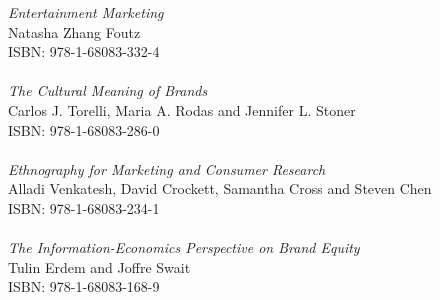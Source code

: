 \vspace{12pt}
\noindent \textit{Entertainment Marketing}\\
Natasha Zhang Foutz\\
ISBN: 978-1-68083-332-4\\
\\
\noindent \textit{The Cultural Meaning of Brands}\\
Carlos J. Torelli, Maria A. Rodas and Jennifer L. Stoner\\
ISBN: 978-1-68083-286-0\\
\\
\noindent \textit{Ethnography for Marketing and Consumer Research}\\
Alladi Venkatesh, David Crockett, Samantha Cross and Steven Chen\\
ISBN: 978-1-68083-234-1\\
\\
\noindent \textit{The Information-Economics Perspective on Brand Equity}\\
Tulin Erdem and Joffre Swait\\
ISBN: 978-1-68083-168-9
